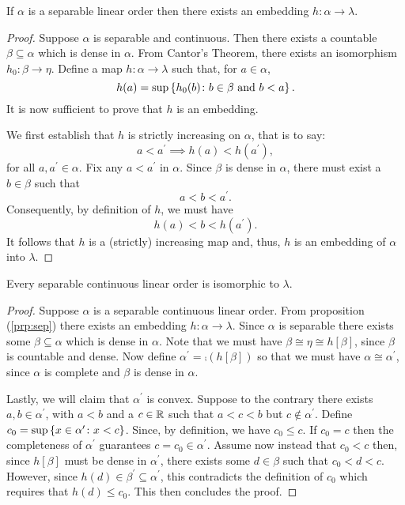 \begin{prp}[Separability]\label{prp:sep}
	If $\alpha$ is a separable linear order then there exists an embedding
	$h\colon\alpha\to\lambda$.
\end{prp}
\begin{proof}
	Suppose $\alpha$ is separable and continuous.  Then there exists a countable
	$\beta\subseteq\alpha$ which is dense in $\alpha$.  From Cantor's Theorem, there
	exists an isomorphism $h_{0}\colon\beta\to\eta$.
	Define a map $h\colon\alpha\to\lambda$ such that, for $a\in\alpha$,
	\begin{equation}
		h(a)=\sup\left\lbrace h_{0}(b)\colon b\in\beta\text{ and }b<a \right\rbrace.
	\end{equation}
	It is now sufficient to prove that $h$ is an embedding.

	We first establish that $h$ is strictly increasing on $\alpha$, that is to
	say:
	\begin{equation}
		a<a^{\prime}\implies h(a)<h(a^{\prime}),
	\end{equation}
	for all $a,a^{\prime}\in\alpha$.  Fix any $a<a^{\prime}$ in $\alpha$. Since
	$\beta$ is dense in $\alpha$, there must exist a $b\in\beta$ such that
	\begin{equation}
		a<b<a^{\prime}.
	\end{equation}
	Consequently, by definition of $h$, we must have
	\begin{equation}
		h(a)<b<h(a^{\prime}).
	\end{equation}
	It follows that $h$ is a (strictly) increasing map and, thus, $h$ is
	an embedding of $\alpha$ into $\lambda$.
\end{proof}

\begin{thm}\label{thm:rchar}
	Every separable continuous linear order is isomorphic to $\lambda$.
\end{thm}
\begin{proof}
	Suppose $\alpha$ is a separable continuous linear order.  From proposition
	(\ref{prp:sep}) there exists an embedding $h\colon\alpha\to\lambda$.  Since
	$\alpha$ is separable there exists some $\beta\subseteq\alpha$ which is dense in
	$\alpha$.  Note that we must have $\beta\cong\eta\cong h[\beta]$, since $\beta$
	is countable and dense.  Now define $\alpha^\prime=\comp(h[\beta])$ so that we
	must have $\alpha\cong\alpha^\prime$, since $\alpha$ is complete and $\beta$ is
	dense in $\alpha$.

	Lastly, we will claim that $\alpha^\prime$ is convex.  Suppose to the
	contrary there exists $a,b\in\alpha^\prime$, with $a<b$ and a $c\in\mathbb{R}$ such
	that $a<c<b$ but $c\notin\alpha^\prime$.  Define
	$c_0=\sup\left\lbrace x\in\alpha^\prime\colon x<c \right\rbrace$. Since, by definition, we have
	$c_0\leq c$.  If $c_0=c$ then the completeness of $\alpha^\prime$ guarantees
	$c=c_0\in\alpha^\prime$.  Assume now instead that $c_0<c$ then, since $h[\beta]$
	must be dense in $\alpha^\prime$, there exists some $d\in\beta$ such that
	$c_0<d<c$.  However, since $h(d)\in\beta^\prime\subseteq\alpha^\prime$, this
	contradicts the definition of $c_0$ which requires that $h(d)\leq c_0$.  This
	then concludes the proof.
\end{proof}


